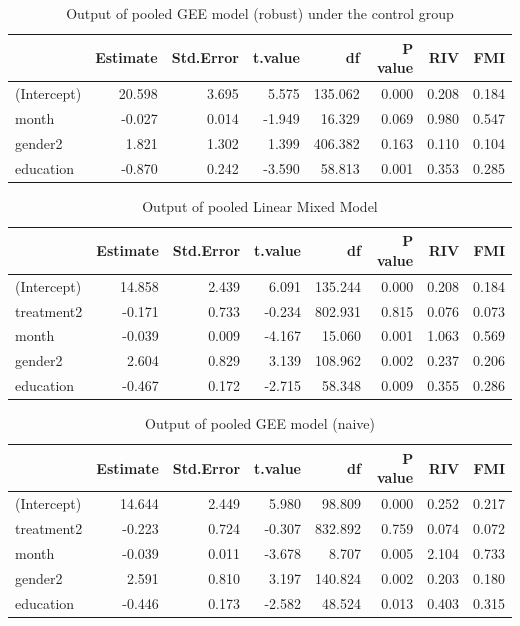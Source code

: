 \begin{table}[H]
\centering
\begin{tabular}{|l|r|r|r|r|r|r|r|}
\hline
  & Estimate & Std.Error & t.value & df & P value & RIV & FMI\\
\hline
(Intercept) & 20.598 & 3.695 & 5.575 & 135.062 & 0.000 & 0.208 & 0.184\\
\hline
month & -0.027 & 0.014 & -1.949 & 16.329 & 0.069 & 0.980 & 0.547\\
\hline
gender2 & 1.821 & 1.302 & 1.399 & 406.382 & 0.163 & 0.110 & 0.104\\
\hline
education & -0.870 & 0.242 & -3.590 & 58.813 & 0.001 & 0.353 & 0.285\\
\hline
\end{tabular}
\caption{Output of pooled GEE model (robust) under the control group}
\label{tab:gee.control.mi.robust}
\end{table}

\begin{table}[H]
\centering
\begin{tabular}{|l|r|r|r|r|r|r|r|}
\hline
  & Estimate & Std.Error & t.value & df & P value & RIV & FMI\\
\hline
(Intercept) & 14.858 & 2.439 & 6.091 & 135.244 & 0.000 & 0.208 & 0.184\\
\hline
treatment2 & -0.171 & 0.733 & -0.234 & 802.931 & 0.815 & 0.076 & 0.073\\
\hline
month & -0.039 & 0.009 & -4.167 & 15.060 & 0.001 & 1.063 & 0.569\\
\hline
gender2 & 2.604 & 0.829 & 3.139 & 108.962 & 0.002 & 0.237 & 0.206\\
\hline
education & -0.467 & 0.172 & -2.715 & 58.348 & 0.009 & 0.355 & 0.286\\
\hline
\end{tabular}
\caption{Output of pooled Linear Mixed Model}
\label{tab:lme.mi}
\end{table}

\begin{table}[H]
\centering
\begin{tabular}{|l|r|r|r|r|r|r|r|}
\hline
  & Estimate & Std.Error & t.value & df & P value & RIV & FMI\\
\hline
(Intercept) & 14.644 & 2.449 & 5.980 & 98.809 & 0.000 & 0.252 & 0.217\\
\hline
treatment2 & -0.223 & 0.724 & -0.307 & 832.892 & 0.759 & 0.074 & 0.072\\
\hline
month & -0.039 & 0.011 & -3.678 & 8.707 & 0.005 & 2.104 & 0.733\\
\hline
gender2 & 2.591 & 0.810 & 3.197 & 140.824 & 0.002 & 0.203 & 0.180\\
\hline
education & -0.446 & 0.173 & -2.582 & 48.524 & 0.013 & 0.403 & 0.315\\
\hline
\end{tabular}
\caption{Output of pooled GEE model (naive)}
\label{tab:gee.mi.naive}
\end{table}


